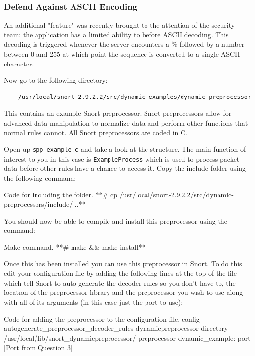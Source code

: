 \documentclass[a4paper,11pt,hidelinks]{article}
\begin{document}
\subsubsection{Defend Against ASCII Encoding}

An additional "feature" was recently brought to the attention of the security team: the application has a limited ability to before ASCII decoding. This decoding is triggered whenever the server encounters a \% followed by a number between 0 and 255 at which point the sequence is converted to a single ASCII character.

Now go to the following directory: 
\begin{verbatim}
    /usr/local/snort-2.9.2.2/src/dynamic-examples/dynamic-preprocessor
\end{verbatim}

This contains an example Snort preprocessor. Snort preprocessors allow for advanced data manipulation to normalize data and perform other functions that normal rules cannot. All Snort preprocessors are coded in C.

Open up \verb=spp_example.c= and take a look at the structure. The main function of interest to you in this case is \verb=ExampleProcess= which is used to process packet data before other rules have a chance to access it. Copy the include folder using the following command:

\begin{code}{Code for including the folder.}
**# cp /usr/local/snort-2.9.2.2/src/dynamic-preprocessors/include/ ..**
\end{code}

You should now be able to compile and install this preprocessor using the command:

\begin{code}{Make command.}
**# make && make install**
\end{code}

Once this has been installed you can use this preprocessor in Snort. To do this edit your configuration file by adding the following lines at the top of the file which tell Snort to auto-generate the decoder rules so you don't have to, the location of the preprocessor library and the preprocessor you wish to use along with all of its arguments (in this case just the port to use):

\begin{code}{Code for adding the preprocessor to the configuration file.}
config autogenerate_preprocessor_decoder_rules
dynamicpreprocessor directory /usr/local/lib/snort_dynamicpreprocessor/
preprocessor dynamic_example: port [Port from Question 3]
\end{code}
\end{document}
